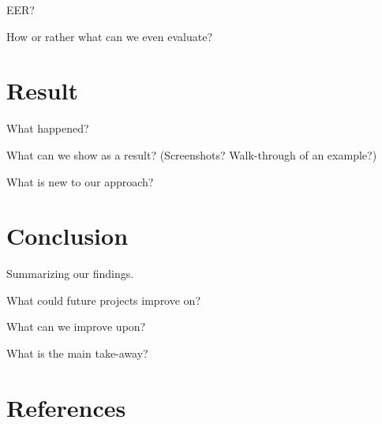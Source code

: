 \documentclass[a4paper,12pt]{article}
\begin{document}
EER?

How or rather what can we even evaluate?


\section {Result} %
What happened?

What can we show as a result? (Screenshots? Walk-through of an example?)

What is new to our approach?

\section{Conclusion} %
Summarizing our findings.

What could future projects improve on?

What can we improve upon?

What is the main take-away?

\section{References}



\end{document}
